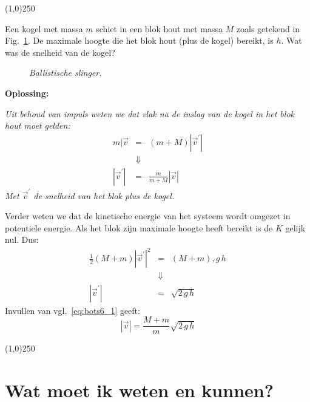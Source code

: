 \begin{center}
\line(1,0){250}
\end{center}

\begin{voorbeeld} \label{ex:bots6}
Een kogel met massa $m$ schiet in een blok hout met massa $M$ zoals getekend in Fig.~\ref{fig:BotsVoorbeeld3}. 
De maximale hoogte die het blok hout (plus de kogel) bereikt, is $h$. Wat was de snelheid van de kogel? 

\begin{figure}[htbp]
\begin{center}
\caption{{\it Ballistische slinger.}}
\label{fig:BotsVoorbeeld3}
\end{center}
\end{figure} 

{\bf Oplossing: }{\it Uit behoud van impuls weten we dat vlak na de inslag van de kogel in het blok hout
moet gelden:
\begin{eqnarray}
m|\vec{v} & = &(m+M) |\vec{v}^{\prime}| \\
& \Downarrow & \\
|\vec{v}^{\prime}| & = & \frac{m}{m+M}|\vec{v}| \label{eq:bots6_1}
\end{eqnarray}
Met $\vec{v}^{\prime}$ de snelheid van het blok plus de kogel.

Verder weten we dat de kinetische energie van het systeem wordt omgezet in
potentiele energie. Als het blok zijn maximale hoogte heeft bereikt is de $K$ gelijk nul. Dus:
\begin{eqnarray}
\frac{1}{2}(M+m)|\vec{v}^{\prime}|^2 & = & (M+m),g\,h \\
& \Downarrow & \\
|\vec{v}^{\prime}| & = & \sqrt{2\,g\,h}
\end{eqnarray}
Invullen van vgl.~\ref{eq:bots6_1} geeft:
\begin{equation}
|\vec{v}| = \frac{M+m}{m}\sqrt{2\,g\,h}
\end{equation}
}
\end{voorbeeld}

\begin{center}
\line(1,0){250}
\end{center}


\section{Wat moet ik weten en kunnen?}


